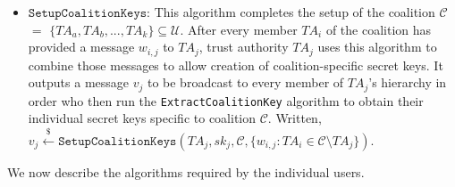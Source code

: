 \documentclass[10pt]{llncs}
\newcommand{\C}{\mathcal{C}}
\newcommand{\U}{\mathcal{U}}
\newcommand{\TA}{\mathit{TA}}
\newcommand{\getsr}{\stackrel{{\scriptscriptstyle\$}}{\gets}}
\begin{document}
\begin{itemize}
\item $\texttt{SetupCoalitionKeys}$: This algorithm completes the
setup of the coalition $\C$ $=$ $\{\TA_a, \TA_b, ..., \TA_k\}
\subseteq \U$. After every member $\TA_{i}$ of the coalition has
provided a message $w_{i,j}$ to $\TA_j$, trust authority $\TA_j$
uses this algorithm to combine those messages to allow creation
of coalition-specific secret keys. It outputs a message $v_j$ to
be broadcast to every member of $\TA_j$'s hierarchy in order who
then run the \texttt{ExtractCoalitionKey} algorithm to obtain
their individual secret keys specific to coalition $\C$.
Written, $v_j \getsr \texttt{SetupCoalitionKeys}(\TA_j,sk_j,
\C, \{w_{i,j} : \TA_i \in \C \setminus \TA_j\})$.

\end{itemize}


We now describe the algorithms required by the individual users.
\end{document}
